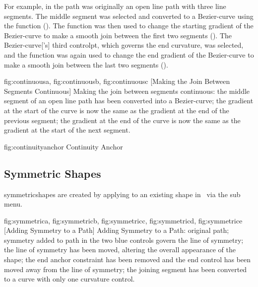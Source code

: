 For example, in  the path was originally
an open line \gls{path} with three line segments.  The middle segment was
selected and converted to a \gls{Bezier-curve} using the
 function
(). The
 function was then
used to change the starting \gls{gradient} of the \gls{Bezier-curve} to make
a smooth join between the first two segments
().  The \gls{Bezier-curve}['s] third
\gls*{controlpt}, which governs the end curvature, was selected, and
the  function was
again used to change the end \gls{gradient} of the \gls{Bezier-curve} to
make a smooth join between the last two segments
().

{
 {fig:continuousa}{}{},
 {fig:continuousb}{}{},
 {fig:continuousc}{}{}
}
[Making the Join Between Segments Continuous]
{Making the join between segments continuous: 
 the middle segment of
an open line path has been converted into a \gls{Bezier-curve};
 the gradient at the start of the curve is now the same as
the gradient at the end of the previous segment; 
 the
gradient at the end of the curve is now the same as the gradient at
the start of the next segment.}

\FloatFig
  {fig:continuityanchor}
   {}
   {Continuity Anchor}


\subsection{Symmetric Shapes}\label{sec:symmetric}

\Glspl{symmetricshape} are created by applying
 to an existing \gls{shape} in 
\editpathmode\ via the  sub menu.

{
  {fig:symmetrica}{}{},
  {fig:symmetricb}{}{},
  {fig:symmetricc}{}{},
  {fig:symmetricd}{}{},
  {fig:symmetrice}{}{}
}
[Adding Symmetry to a Path]
{Adding Symmetry to a Path:  original path;
 symmetry added to path in  the
two blue controls govern the line of symmetry;
 the line of symmetry has been moved, altering the
overall appearance of the shape;  the end anchor
constraint has been removed and the end control has been moved
away from the line of symmetry;  the joining segment
has been converted to a curve with only one curvature control.}

